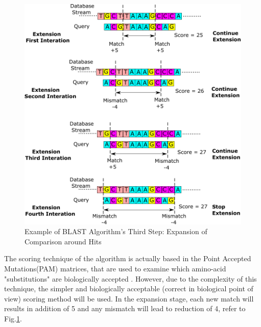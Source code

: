 \begin{figure}[h!]
\centering
\includegraphics[width=\columnwidth]{Figures/Algorithm3.pdf}
\caption{Example of BLAST Algorithm's Third Step: Expansion of Comparison around Hits} \label{fig:step3}
\end{figure}



The scoring technique of the algorithm is actually based in the Point Accepted Mutations(PAM) matrices, that are used to examine which amino-acid "substitutions" are biologically accepted \cite{sotiriades2007design}. However, due to the complexity of this technique, the simpler and biologically acceptable (correct in biological point of view) scoring method will be used. In the expansion stage, each new match will results in addition of 5 and any mismatch will lead to reduction of 4, refer to Fig.\ref{fig:step3}.

